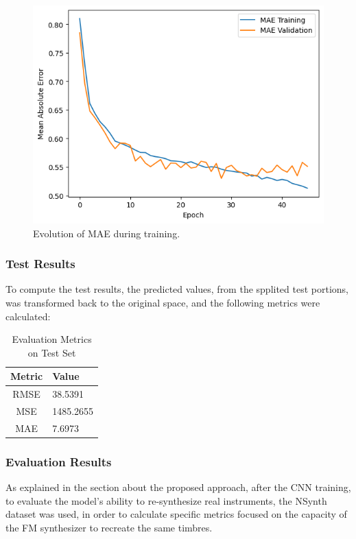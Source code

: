 \documentclass[sigconf,natbib=false]{acmart}
\begin{document}
\begin{figure}[h]
 \centering
 \includegraphics[width=\linewidth]{figs/mae_evolution.png}
 \caption{Evolution of MAE during training.}
\end{figure}

\subsubsection{Test Results}

To compute the test results, the predicted values, from the spplited test portions, was transformed back to the original space, and the following metrics were calculated:

\begin{table}
  \caption{Evaluation Metrics on Test Set}
  \label{tab:test_metrics}
  \begin{tabular}{cl}
    \toprule
    Metric & Value \\
    \midrule
    RMSE & 38.5391 \\
    MSE  & 1485.2655 \\
    MAE  & 7.6973 \\
    \bottomrule
  \end{tabular}
\end{table}

\subsubsection{Evaluation Results}

As explained in the section about the proposed approach, after the CNN training, to evaluate the model's ability to re-synthesize real instruments, the NSynth dataset was used, in order to calculate specific metrics focused on the capacity of the FM synthesizer to recreate the same timbres.
\end{document}

